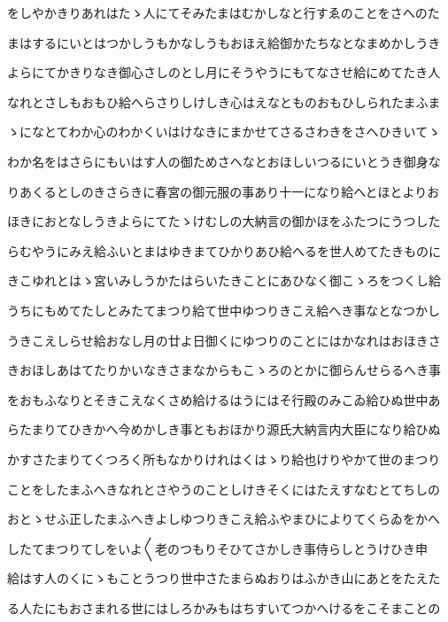 \documentclass[a4paper,11pt,landscape]{ltjtarticle}
\begin{document}
\par\medskip
をしやかきりあれはたゝ人にてそみたまはむかしなと行すゑのことをさへのた
\par\medskip
まはするにいとはつかしうもかなしうもおほえ給御かたちなとなまめかしうき
\par\medskip
よらにてかきりなき御心さしのとし月にそうやうにもてなさせ給にめてたき人
\par\medskip
なれとさしもおもひ給へらさりしけしき心はえなとものおもひしられたまふま
\par\medskip
ゝになとてわか心のわかくいはけなきにまかせてさるさわきをさへひきいてゝ
\par\medskip
わか名をはさらにもいはす人の御ためさへなとおほしいつるにいとうき御身な
\par\medskip
りあくるとしのきさらきに春宮の御元服の事あり十一になり給へとほとよりお
\par\medskip
ほきにおとなしうきよらにてたゝけむしの大納言の御かほをふたつにうつした
\par\medskip
らむやうにみえ給ふいとまはゆきまてひかりあひ給へるを世人めてたきものに
\par\medskip
きこゆれとはゝ宮いみしうかたはらいたきことにあひなく御こゝろをつくし給
\par\medskip
うちにもめてたしとみたてまつり給て世中ゆつりきこえ給へき事なとなつかし
\par\medskip
うきこえしらせ給おなし月の廿よ日御くにゆつりのことにはかなれはおほきさ
\par\medskip
きおほしあはてたりかいなきさまなからもこゝろのとかに御らんせらるへき事
\par\medskip
をおもふなりとそきこえなくさめ給けるはうにはそ行殿のみこゐ給ひぬ世中あ
\par\medskip
らたまりてひきかへ今めかしき事ともおほかり源氏大納言内大臣になり給ひぬ
\par\medskip
かすさたまりてくつろく所もなかりけれはくはゝり給也けりやかて世のまつり
\par\medskip
ことをしたまふへきなれとさやうのことしけきそくにはたえすなむとてちしの
\par\medskip
おとゝせふ正したまふへきよしゆつりきこえ給ふやまひによりてくらゐをかへ
\par\medskip
したてまつりてしをいよ〱老のつもりそひてさかしき事侍らしとうけひき申
\par\medskip
給はす人のくにゝもことうつり世中さたまらぬおりはふかき山にあとをたえた
\par\medskip
る人たにもおさまれる世にはしろかみもはちすいてつかへけるをこそまことの
\end{document}
